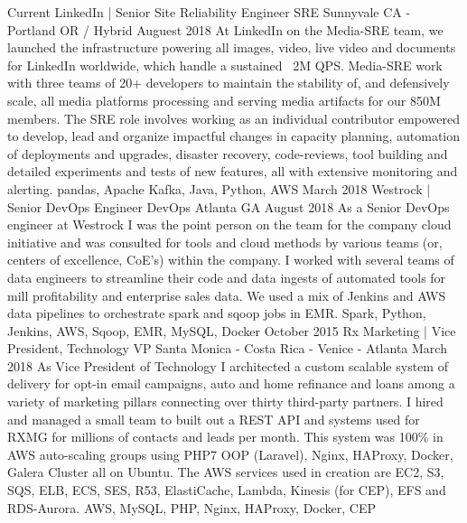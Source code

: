 %
%
%
\begin{experiences}
  \experience
    {Current} {LinkedIn | Senior Site Reliability Engineer} {SRE} {Sunnyvale CA - Portland OR / Hybrid}
    {Auguest 2018}    {
    At LinkedIn on the Media-SRE team, we launched the infrastructure powering all images,
video, live video and documents for LinkedIn worldwide, which handle a sustained ~2M
QPS. Media-SRE work with three teams of 20+ developers to maintain the stability of, and
defensively scale, all media platforms processing and serving media artifacts for our 850M members.
The SRE role involves working as an individual contributor empowered to develop, lead and organize impactful changes in capacity planning, automation of deployments and upgrades, disaster recovery, code-reviews, tool building and detailed experiments and tests of new features, all with extensive monitoring and alerting.
                    }
                    {pandas, Apache Kafka, Java, Python, AWS}
  \emptySeparator
  \experience
    {March 2018} {Westrock | Senior DevOps Engineer} {DevOps}  {Atlanta GA}
    {August 2018}    {
                      As a Senior DevOps engineer at Westrock I was the point person on the team for the
company cloud initiative and was consulted for tools and cloud methods by various teams
(or, centers of excellence, CoE's) within the company. I worked with several teams of data
engineers to streamline their code and data ingests of automated tools for mill profitability
and enterprise sales data. We used a mix of Jenkins and AWS data pipelines to orchestrate
spark and sqoop jobs in EMR.
                    }
                    {Spark, Python, Jenkins, AWS, Sqoop, EMR, MySQL, Docker}
  \emptySeparator
  \experience
    {October 2015} {Rx Marketing | Vice President, Technology} {VP}  {Santa Monica - Costa Rica - Venice - Atlanta}
    {March 2018}    {
                      As Vice President of Technology I architected a custom scalable system of delivery for
opt-in email campaigns, auto and home refinance and loans among a variety of marketing
pillars connecting over thirty third-party partners. I hired and managed a small team to built
out a REST API and systems used for RXMG for millions of contacts and leads per month.
This system was 100\% in AWS auto-scaling groups using PHP7 OOP (Laravel), Nginx,
HAProxy, Docker, Galera Cluster all on Ubuntu. The AWS services used in creation are EC2, S3, SQS, ELB, ECS, SES, R53, ElastiCache, Lambda, Kinesis (for CEP), EFS and RDS-Aurora.
                    }
                    {AWS, MySQL, PHP, Nginx, HAProxy, Docker, CEP}
  \emptySeparator
\end{experiences}
